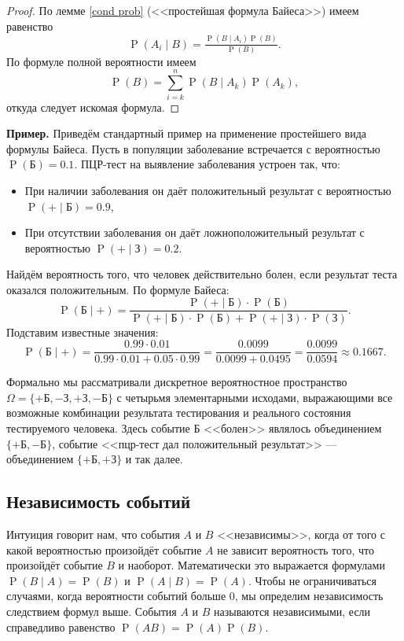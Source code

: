 \documentclass[12pt]{article}
\numberwithin{theorem}{section}
\theoremstyle{definition}
\newenvironment{example}{\indent \textbf{Пример.}}{\indent}
\newcommand{\prob}{\operatorname{P}}
\newcommand{\defin}[2]{\hypertarget{#2}{{\color{red} #1}}}
\begin{document}
	\begin{proof}
		По лемме \ref{cond prob} (<<простейшая формула Байеса>>) имеем равенство
		$$ \prob(A_i \mid B) = \tfrac{\prob(B \mid A_i)\prob(B)}{\prob(B)}. $$
		По формуле полной вероятности имеем
		$$ \prob(B) = \sum\limits_{i = k}^{n} \prob(B \mid A_k)\prob(A_k), $$
		откуда следует искомая формула.
	\end{proof}
	
	\begin{example}
		Приведём стандартный пример на применение простейшего вида формулы Байеса.
		Пусть в популяции заболевание встречается с вероятностью \( \prob(\text{Б}) = 0.1 \).  
		ПЦР-тест на выявление заболевания устроен так, что:
		\begin{itemize}
			\item При наличии заболевания он даёт положительный результат с вероятностью \( \prob(+ \mid \text{Б}) = 0.9 \),
			\item При отсутствии заболевания он даёт ложноположительный результат с вероятностью 
			\( \prob(+ \mid \text{З}) = 0.2 \).
		\end{itemize}
		Найдём вероятность того, что человек действительно болен, если результат теста оказался положительным.
		По формуле Байеса:
		$$ \prob(\text{Б} \mid +) 
		= \frac{\prob(+ \mid \text{Б})\cdot \prob(\text{Б})}
		{\prob(+ \mid \text{Б})\cdot \prob(\text{Б}) + \prob(+ \mid \text{З})\cdot \prob(\text{З})}.
		$$
		Подставим известные значения:
		$$
		 \prob(\text{Б} \mid +) = \frac{0.99 \cdot 0.01}
		 {0.99 \cdot 0.01 + 0.05 \cdot 0.99} = \frac{0.0099}{0.0099 + 0.0495} = \frac{0.0099}{0.0594} \approx 0.1667.
		$$
		
		Формально мы рассматривали дискретное вероятностное пространство 
		$ \Omega = \{+\text{Б},-\text{З},+\text{З},-\text{Б}\} $ с четырьмя элементарными исходами,
		выражающими все возможные комбинации результата тестирования и реального состояния тестируемого человека.
		Здесь событие Б <<болен>> являлось объединением $ \{+\text{Б},-\text{Б} \} $,
		событие <<пцр-тест дал положительный результат>> --- объединением $ \{+\text{Б},+\text{З} \} $
		и так далее.
		\end{example}
	
	\subsection{Независимость событий}
	
	Интуиция говорит нам, что события $ A $ и $ B $ <<независимы>>, когда от того с какой вероятностью произойдёт событие $ A $
	не зависит вероятность того, что произойдёт событие $ B $ и наоборот.
	Математически это выражается формулами $ \prob(B \mid A) = \prob(B) $ и $ \prob(A \mid B) = \prob(A) $.
	Чтобы не ограничиваться случаями, когда вероятности событий больше 0, мы определим независимость
	следствием формул выше. События $ A $ и $ B $ называются \defin{независимыми}{independent}, если справедливо равенство
	$ \prob(AB) = \prob(A)\prob(B) $.
	
\end{document}
